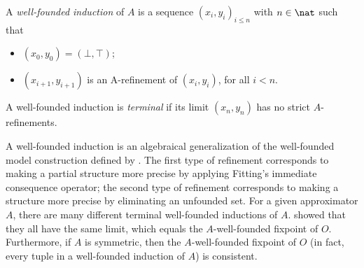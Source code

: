  \begin{definition}
 A \emph{well-founded induction} of $A$  is a sequence 
$(x_i,y_i)_{i\leq n}$
with $n\in\nat$ such that 
\begin{itemize}
	\item $(x_0,y_0) = (\bot,\top)$;
	\item $(x_{i+1},y_{i+1})$ is an A-refinement of $(x_{i},y_{i})$, for  all $i<n$.
\end{itemize}
A well-founded induction is \emph{terminal} if its limit $(x_n,y_n)$ has no strict $A$-refinements.
\end{definition}
A well-founded induction is an algebraical generalization of the well-founded model construction defined by \citet{GelderRS91}. 
The first type of refinement corresponds to making a partial structure more precise by applying Fitting's immediate consequence operator; the second type of refinement corresponds to making a structure more precise by eliminating an unfounded set. 
For a given approximator $A$, there are many different terminal well-founded inductions of $A$.
\citet{lpnmr/DeneckerV07}  showed that they all have the same limit, which equals the $A$-well-founded fixpoint of $O$. Furthermore, if $A$ is symmetric, then the $A$-well-founded fixpoint of $O$ (in fact, every tuple in a well-founded induction of $A$) is consistent.


